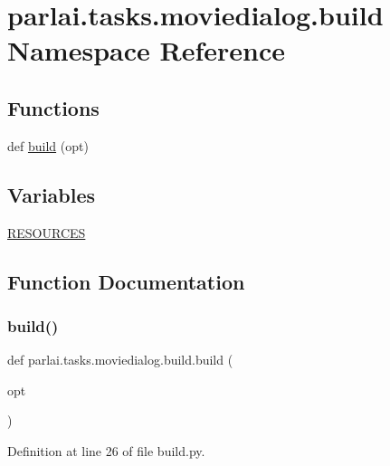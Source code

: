 \hypertarget{namespaceparlai_1_1tasks_1_1moviedialog_1_1build}{}\section{parlai.\+tasks.\+moviedialog.\+build Namespace Reference}
\label{namespaceparlai_1_1tasks_1_1moviedialog_1_1build}
\subsection*{Functions}
\begin{DoxyCompactItemize}
\item 
def \hyperlink{namespaceparlai_1_1tasks_1_1moviedialog_1_1build_a844c68eb87eb666ec20f2b507813469a}{build} (opt)
\end{DoxyCompactItemize}
\subsection*{Variables}
\begin{DoxyCompactItemize}
\item 
\hyperlink{namespaceparlai_1_1tasks_1_1moviedialog_1_1build_a6a0958effc5a7e76d7f4506ba4044d0a}{R\+E\+S\+O\+U\+R\+C\+ES}
\end{DoxyCompactItemize}


\subsection{Function Documentation}
\mbox{\label{namespaceparlai_1_1tasks_1_1moviedialog_1_1build_a844c68eb87eb666ec20f2b507813469a}} 
\subsubsection{\texorpdfstring{build()}{build()}}
{\footnotesize\ttfamily def parlai.\+tasks.\+moviedialog.\+build.\+build (\begin{DoxyParamCaption}\item[{}]{opt }\end{DoxyParamCaption})}



Definition at line 26 of file build.\+py.


